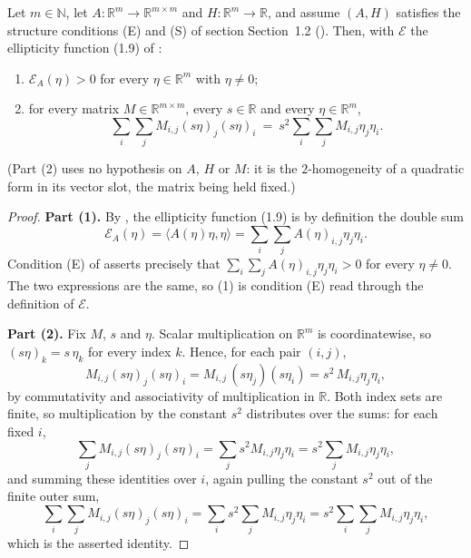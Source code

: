 \begin{lemma}
Let $m\in\mathbb N$, let $A:\mathbb R^{m}\to\mathbb R^{m\times m}$ and
$H:\mathbb R^{m}\to\mathbb R$, and assume $(A,H)$ satisfies the structure conditions (E) and
(S) of section Section~1.2 (). Then, with $\mathcal E$ the
ellipticity function (1.9) of :
\begin{enumerate}
\item $\mathcal E_A(\eta)>0$ for every $\eta\in\mathbb R^{m}$ with $\eta\ne0$;
\item for every matrix $M\in\mathbb R^{m\times m}$, every $s\in\mathbb R$ and every
  $\eta\in\mathbb R^{m}$,
  \[
   \sum_{i}\sum_{j}M_{i,j}(s\eta)_j(s\eta)_i\ =\ s^{2}\sum_{i}\sum_{j}M_{i,j}\eta_j\eta_i .
  \]
\end{enumerate}
(Part (2) uses no hypothesis on $A$, $H$ or $M$: it is the $2$-homogeneity of a quadratic
form in its vector slot, the matrix being held fixed.)
\end{lemma}
\begin{proof}
\noindent\textbf{Part (1).} By , the ellipticity function (1.9) is by
definition the double sum
\[
 \mathcal E_A(\eta)=\langle A(\eta)\eta,\eta\rangle=\sum_{i}\sum_{j}A(\eta)_{i,j}\eta_j\eta_i .
\]
Condition (E) of  asserts precisely that
$\sum_{i}\sum_{j}A(\eta)_{i,j}\eta_j\eta_i>0$ for every $\eta\ne0$. The two expressions are
the same, so (1) is condition (E) read through the definition of $\mathcal E$.

\medskip\noindent\textbf{Part (2).} Fix $M$, $s$ and $\eta$. Scalar multiplication on
$\mathbb R^{m}$ is coordinatewise, so $(s\eta)_k=s\,\eta_k$ for every index $k$. Hence, for
each pair $(i,j)$,
\[
 M_{i,j}(s\eta)_j(s\eta)_i=M_{i,j}\,(s\eta_j)(s\eta_i)=s^{2}\,M_{i,j}\eta_j\eta_i ,
\]
by commutativity and associativity of multiplication in $\mathbb R$. Both index sets are
finite, so multiplication by the constant $s^{2}$ distributes over the sums: for each fixed
$i$,
\[
 \sum_{j}M_{i,j}(s\eta)_j(s\eta)_i=\sum_{j}s^{2}M_{i,j}\eta_j\eta_i
  =s^{2}\sum_{j}M_{i,j}\eta_j\eta_i ,
\]
and summing these identities over $i$, again pulling the constant $s^{2}$ out of the finite
outer sum,
\[
 \sum_{i}\sum_{j}M_{i,j}(s\eta)_j(s\eta)_i
  =\sum_{i}s^{2}\sum_{j}M_{i,j}\eta_j\eta_i
  =s^{2}\sum_{i}\sum_{j}M_{i,j}\eta_j\eta_i ,
\]
which is the asserted identity.
\end{proof}
